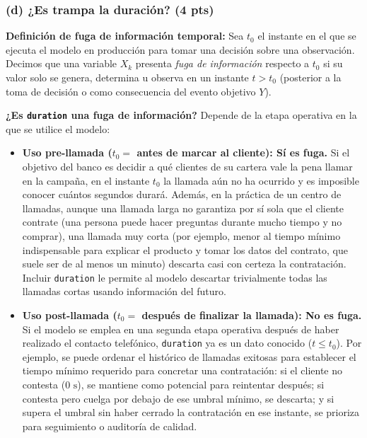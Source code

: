 \documentclass[11pt, letterpaper]{article}
\begin{document}
\subsubsection*{(d) ¿Es trampa la duración? (4 pts)}

\textbf{Definición de fuga de información temporal:} Sea $t_0$ el instante en el que se ejecuta el modelo en producción para tomar una decisión sobre una observación. Decimos que una variable $X_k$ presenta \emph{fuga de información} respecto a $t_0$ si su valor solo se genera, determina u observa en un instante $t > t_0$ (posterior a la toma de decisión o como consecuencia del evento objetivo $Y$).

\textbf{¿Es \texttt{duration} una fuga de información?} Depende de la etapa operativa en la que se utilice el modelo:
\begin{itemize}
    \item \textbf{Uso pre-llamada ($t_0 =$ antes de marcar al cliente): Sí es fuga.} Si el objetivo del banco es decidir a qué clientes de su cartera vale la pena llamar en la campaña, en el instante $t_0$ la llamada aún no ha ocurrido y es imposible conocer cuántos segundos durará. Además, en la práctica de un centro de llamadas, aunque una llamada larga no garantiza por sí sola que el cliente contrate (una persona puede hacer preguntas durante mucho tiempo y no comprar), una llamada muy corta (por ejemplo, menor al tiempo mínimo indispensable para explicar el producto y tomar los datos del contrato, que suele ser de al menos un minuto) descarta casi con certeza la contratación. Incluir \texttt{duration} le permite al modelo descartar trivialmente todas las llamadas cortas usando información del futuro.
    \item \textbf{Uso post-llamada ($t_0 =$ después de finalizar la llamada): No es fuga.} Si el modelo se emplea en una segunda etapa operativa después de haber realizado el contacto telefónico, \texttt{duration} ya es un dato conocido ($t \le t_0$). Por ejemplo, se puede ordenar el histórico de llamadas exitosas para establecer el tiempo mínimo requerido para concretar una contratación: si el cliente no contesta ($0\text{ s}$), se mantiene como potencial para reintentar después; si contesta pero cuelga por debajo de ese umbral mínimo, se descarta; y si supera el umbral sin haber cerrado la contratación en ese instante, se prioriza para seguimiento o auditoría de calidad.
\end{itemize}
\end{document}
